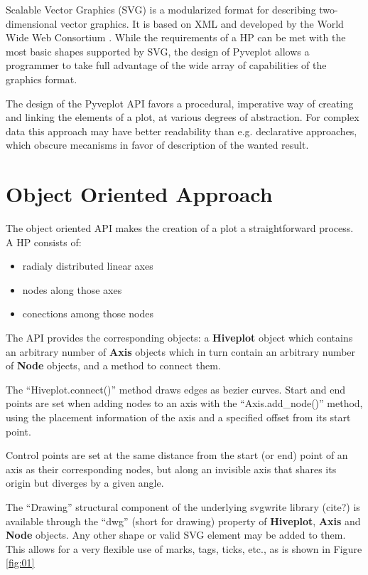 \documentclass{bioinfo}
\begin{document}
Scalable Vector Graphics (SVG) is a modularized format for describing
two-dimensional vector graphics. It is based on XML and developed by
the World Wide Web Consortium \cite{McCormack:11:SVG}. While the
requirements of a HP can be met with the most basic shapes supported
by SVG, the design of Pyveplot allows a programmer to take full
advantage of the wide array of capabilities of the graphics format.

The design of the Pyveplot API favors a procedural, imperative way of
creating and linking the elements of a plot, at various degrees of
abstraction. For complex data this approach may have better
readability than e.g. declarative approaches, which obscure mecanisms in
favor of description of the wanted result.

\section{Object Oriented Approach}

The object oriented API makes the creation of a plot a straightforward
process. A HP consists of:
\begin{itemize}
\item radialy distributed linear axes
\item nodes along those axes
\item conections among those nodes
\end{itemize}
The API provides the corresponding objects: a {\bfseries Hiveplot} object
which contains an arbitrary number of {\bfseries Axis} objects which in
turn contain an arbitrary number of {\bfseries Node} objects, and a method
to connect them.

The ``Hiveplot.connect()'' method draws edges as bezier curves. Start
and end points are set when adding nodes to an axis with the
``Axis.add\_node()'' method, using the placement information of the
axis and a specified offset from its start point.

Control points are set at the same distance from the start (or end)
point of an axis as their corresponding nodes, but along an invisible
axis that shares its origin but diverges by a given angle.

The ``Drawing'' structural component of the underlying svgwrite
library (cite?) is available through the ``dwg'' (short for drawing)
property of {\bfseries Hiveplot}, {\bfseries Axis} and {\bfseries
  Node} objects. Any other shape or valid SVG element may be added to
them. This allows for a very flexible use of marks, tags, ticks, etc.,
as is shown in Figure \ref{fig:01}
\end{document}
